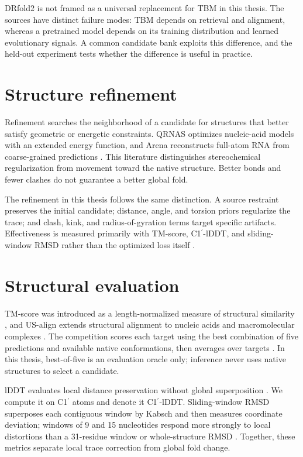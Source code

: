 \documentclass[12pt,a4paper,oneside]{report}
\newcommand{\cprime}{C1$^{\prime}$}
\begin{document}
DRfold2 is not framed as a universal replacement for TBM in this thesis. The sources
have distinct failure modes: TBM depends on retrieval and alignment, whereas a pretrained
model depends on its training distribution and learned evolutionary signals. A common
candidate bank exploits this difference, and the held-out experiment tests whether the
difference is useful in practice.

\section{Structure refinement}

Refinement searches the neighborhood of a candidate for structures that better satisfy
geometric or energetic constraints. QRNAS optimizes nucleic-acid models with an extended
energy function, and Arena reconstructs full-atom RNA from coarse-grained predictions
\cite{qrnas,arena}. This literature distinguishes stereochemical regularization from
movement toward the native structure. Better bonds and fewer clashes do not guarantee a
better global fold.

The refinement in this thesis follows the same distinction. A source restraint preserves
the initial candidate; distance, angle, and torsion priors regularize the trace; and
clash, kink, and radius-of-gyration terms target specific artifacts. Effectiveness is
measured primarily with TM-score, \cprime{}-lDDT, and sliding-window RMSD rather than the
optimized loss itself \cite{tm_score,lddt,usalign}.

\section{Structural evaluation}

TM-score was introduced as a length-normalized measure of structural similarity
\cite{tm_score}, and US-align extends structural alignment to nucleic acids and
macromolecular complexes \cite{usalign}. The competition scores each target using the
best combination of five predictions and available native conformations, then averages
over targets \cite{competition_paper}. In this thesis, best-of-five is an evaluation
oracle only; inference never uses native structures to select a candidate.

lDDT evaluates local distance preservation without global superposition \cite{lddt}.
We compute it on \cprime{} atoms and denote it \cprime{}-lDDT. Sliding-window RMSD
superposes each contiguous window by Kabsch and then measures coordinate deviation;
windows of 9 and 15 nucleotides respond more strongly to local distortions than a
31-residue window or whole-structure RMSD \cite{kabsch}. Together, these metrics separate
local trace correction from global fold change.
\end{document}
